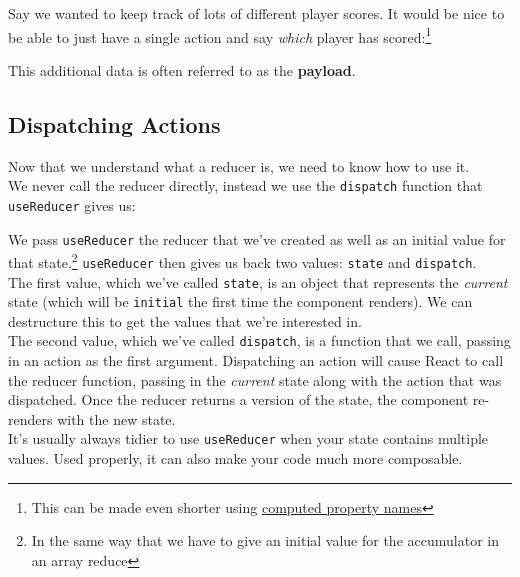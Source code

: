 Say we wanted to keep track of lots of different player scores. It would be nice to be able to just have a single action and say \textit{which} player has scored:\footnote{This can be made even shorter using \href{https://tylermcginnis.com/computed-property-names/}{computed property names}}


This additional data is often referred to as the \textbf{payload}.


\subsection{Dispatching Actions}

Now that we understand what a reducer is, we need to know how to use it.
\\

We never call the reducer directly, instead we use the \texttt{dispatch} function that \texttt{useReducer} gives us:


We pass \texttt{useReducer} the reducer that we've created as well as an initial value for that state.\footnote{In the same way that we have to give an initial value for the accumulator in an array reduce} \texttt{useReducer} then gives us back two values: \texttt{state} and \texttt{dispatch}.
\\

The first value, which we've called \texttt{state}, is an object that represents the \textit{current} state (which will be \texttt{initial} the first time the component renders). We can destructure this to get the values that we're interested in.
\\

The second value, which we've called \texttt{dispatch}, is a function that we call, passing in an action as the first argument. Dispatching an action will cause React to call the reducer function, passing in the \textit{current} state along with the action that was dispatched. Once the reducer returns a version of the state, the component re-renders with the new state.
\\

It's usually always tidier to use \texttt{useReducer} when your state contains multiple values. Used properly, it can also make your code much more composable.

\pagebreak

